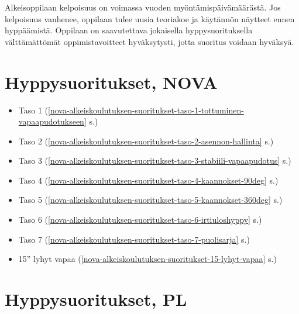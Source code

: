 
Alkeisoppilaan kelpoisuus on voimassa vuoden myöntämispäivämäärästä. Jos kelpoisuus vanhenee, oppilaan tulee uusia teoriakoe ja käytännön näytteet ennen hyppäämistä. Oppilaan on saavutettava jokaisella hyppysuorituksella välttämättömät oppimistavoitteet hyväksytysti, jotta suoritus voidaan hyväksyä. 

\section{ Hyppysuoritukset, NOVA }
\label{yhteenveto-alkeiskoulutus-hyppysuoritukset-nova}

\begin{itemize}
\item  Taso 1 (\ref{nova-alkeiskoulutuksen-suoritukset-taso-1-tottuminen-vapaapudotukseen} s.\pageref{nova-alkeiskoulutuksen-suoritukset-taso-1-tottuminen-vapaapudotukseen}) 
\item  Taso 2 (\ref{nova-alkeiskoulutuksen-suoritukset-taso-2-asennon-hallinta} s.\pageref{nova-alkeiskoulutuksen-suoritukset-taso-2-asennon-hallinta}) 
\item  Taso 3 (\ref{nova-alkeiskoulutuksen-suoritukset-taso-3-stabiili-vapaapudotus} s.\pageref{nova-alkeiskoulutuksen-suoritukset-taso-3-stabiili-vapaapudotus}) 
\item  Taso 4 (\ref{nova-alkeiskoulutuksen-suoritukset-taso-4-kaannokset-90deg} s.\pageref{nova-alkeiskoulutuksen-suoritukset-taso-4-kaannokset-90deg}) 
\item  Taso 5 (\ref{nova-alkeiskoulutuksen-suoritukset-taso-5-kaannokset-360deg} s.\pageref{nova-alkeiskoulutuksen-suoritukset-taso-5-kaannokset-360deg}) 
\item  Taso 6 (\ref{nova-alkeiskoulutuksen-suoritukset-taso-6-irtiuloshyppy} s.\pageref{nova-alkeiskoulutuksen-suoritukset-taso-6-irtiuloshyppy}) 
\item  Taso 7 (\ref{nova-alkeiskoulutuksen-suoritukset-taso-7-puolisarja} s.\pageref{nova-alkeiskoulutuksen-suoritukset-taso-7-puolisarja}) 
\item  15'' lyhyt vapaa (\ref{nova-alkeiskoulutuksen-suoritukset-15-lyhyt-vapaa} s.\pageref{nova-alkeiskoulutuksen-suoritukset-15-lyhyt-vapaa}) 
\end{itemize}
\section{ Hyppysuoritukset, PL }
\label{yhteenveto-alkeiskoulutus-hyppysuoritukset-pl}

